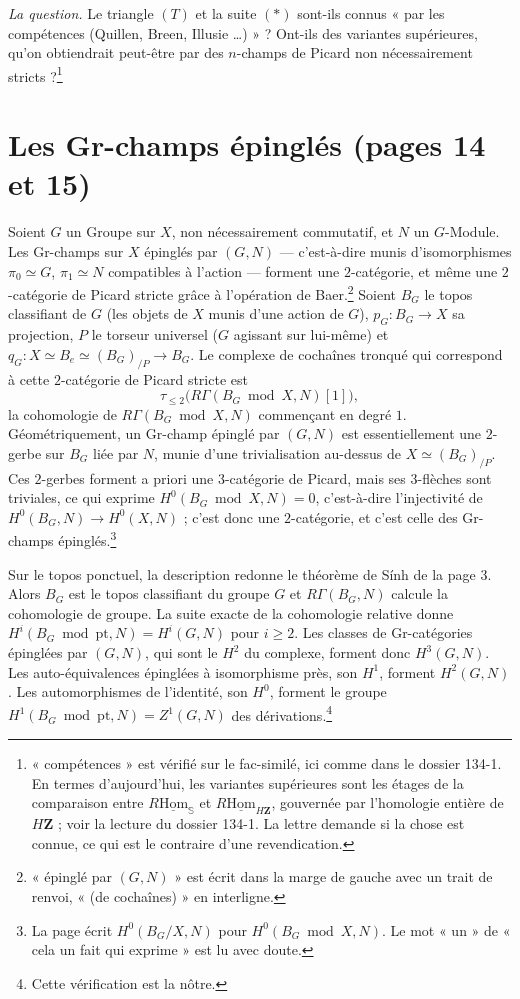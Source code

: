 \documentclass[11pt,a4paper]{article}
\begin{document}
\emph{La question.} Le triangle $(T)$ et la suite $(*)$ sont-ils connus « par
les compétences (Quillen, Breen, Illusie …) » ? Ont-ils des variantes
supérieures, qu'on obtiendrait peut-être par des $n$-champs de Picard non
nécessairement stricts ?\footnote{« compétences » est vérifié sur le
fac-similé, ici comme dans le dossier 134-1. En termes d'aujourd'hui, les
variantes supérieures sont les étages de la comparaison entre
$R\underline{\mathrm{Hom}}_{\mathbb{S}}$ et
$R\underline{\mathrm{Hom}}_{H\mathbf{Z}}$, gouvernée par l'homologie entière
de $H\mathbf{Z}$ ; voir la lecture du dossier 134-1. La lettre demande si la
chose est connue, ce qui est le contraire d'une revendication.}

\section*{Les Gr-champs épinglés (pages 14 et 15)}

Soient $G$ un Groupe sur $X$, non nécessairement commutatif, et $N$ un
$G$-Module. Les Gr-champs sur $X$ épinglés par $(G, N)$ --- c'est-à-dire
munis d'isomorphismes $\pi_0 \simeq G$, $\pi_1 \simeq N$ compatibles à
l'action --- forment une $2$-catégorie, et même une $2$-catégorie de Picard
stricte grâce à l'opération de Baer.\footnote{« épinglé par $(G,N)$ » est
écrit dans la marge de gauche avec un trait de renvoi, « (de cochaînes) »
en interligne.} Soient $B_G$ le topos classifiant de $G$ (les objets de $X$
munis d'une action de $G$), $p_G : B_G \to X$ sa projection, $P$ le torseur
universel ($G$ agissant sur lui-même) et
$q_G : X \simeq B_e \simeq (B_G)_{/P} \to B_G$. Le complexe de cochaînes
tronqué qui correspond à cette $2$-catégorie de Picard stricte est
\[ \tau_{\leq 2}\bigl( R\Gamma(B_G \bmod X, N)[1] \bigr) , \]
la cohomologie de $R\Gamma(B_G \bmod X, N)$ commençant en degré $1$.
Géométriquement, un Gr-champ épinglé par $(G, N)$ est essentiellement une
$2$-gerbe sur $B_G$ liée par $N$, munie d'une trivialisation au-dessus de
$X \simeq (B_G)_{/P}$. Ces $2$-gerbes forment a priori une $3$-catégorie de
Picard, mais ses $3$-flèches sont triviales, ce qui exprime
$H^0(B_G \bmod X, N) = 0$, c'est-à-dire l'injectivité de
$H^0(B_G, N) \to H^0(X, N)$ ; c'est donc une $2$-catégorie, et c'est celle des
Gr-champs épinglés.\footnote{La page écrit $H^0(B_G/X, N)$ pour
$H^0(B_G \bmod X, N)$. Le mot « un » de « cela un fait qui exprime » est lu
avec doute.}

Sur le topos ponctuel, la description redonne le théorème de Sính de la
page 3. Alors $B_G$ est le topos classifiant du groupe $G$ et
$R\Gamma(B_G, N)$ calcule la cohomologie de groupe. La suite exacte de la
cohomologie relative donne $H^{i}(B_G \bmod \mathrm{pt}, N) = H^{i}(G, N)$
pour $i \geq 2$. Les classes de Gr-catégories épinglées par $(G, N)$, qui sont
le $H^2$ du complexe, forment donc $H^3(G, N)$. Les auto-équivalences
épinglées à isomorphisme près, son $H^1$, forment $H^2(G, N)$. Les
automorphismes de l'identité, son $H^0$, forment le groupe
$H^1(B_G \bmod \mathrm{pt}, N) = Z^1(G, N)$ des
dérivations.\footnote{Cette vérification est la nôtre.}
\end{document}

